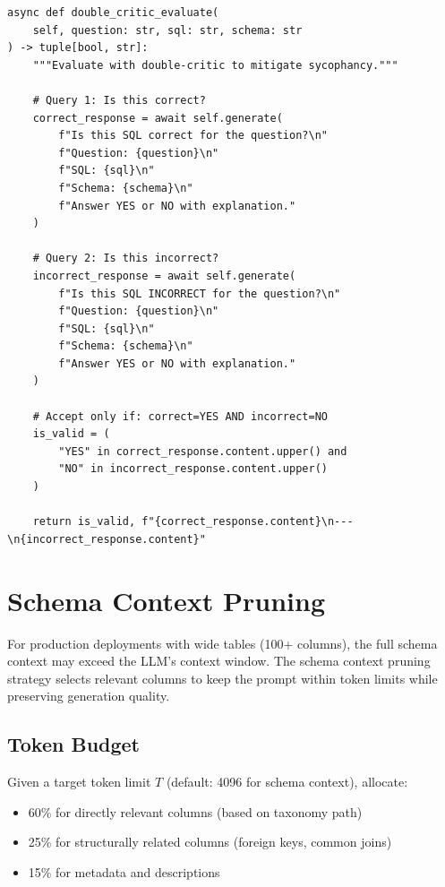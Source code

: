 \begin{lstlisting}[language=jsonx,caption={Double-critic evaluation (simula\_llm\_client.py, lines 180--220)}]
async def double_critic_evaluate(
    self, question: str, sql: str, schema: str
) -> tuple[bool, str]:
    """Evaluate with double-critic to mitigate sycophancy."""
    
    # Query 1: Is this correct?
    correct_response = await self.generate(
        f"Is this SQL correct for the question?\n"
        f"Question: {question}\n"
        f"SQL: {sql}\n"
        f"Schema: {schema}\n"
        f"Answer YES or NO with explanation."
    )
    
    # Query 2: Is this incorrect?
    incorrect_response = await self.generate(
        f"Is this SQL INCORRECT for the question?\n"
        f"Question: {question}\n"
        f"SQL: {sql}\n"
        f"Schema: {schema}\n"
        f"Answer YES or NO with explanation."
    )
    
    # Accept only if: correct=YES AND incorrect=NO
    is_valid = (
        "YES" in correct_response.content.upper() and
        "NO" in incorrect_response.content.upper()
    )
    
    return is_valid, f"{correct_response.content}\n---\n{incorrect_response.content}"
\end{lstlisting}

\section{Schema Context Pruning}
\label{sec:schema-context-pruning}

For production deployments with wide tables (100+ columns), the full schema context
may exceed the LLM's context window. The schema context pruning strategy selects
relevant columns to keep the prompt within token limits while preserving generation quality.

\subsection{Token Budget}

Given a target token limit $T$ (default: 4096 for schema context), allocate:
\begin{itemize}
  \item 60\% for directly relevant columns (based on taxonomy path)
  \item 25\% for structurally related columns (foreign keys, common joins)
  \item 15\% for metadata and descriptions
\end{itemize}

